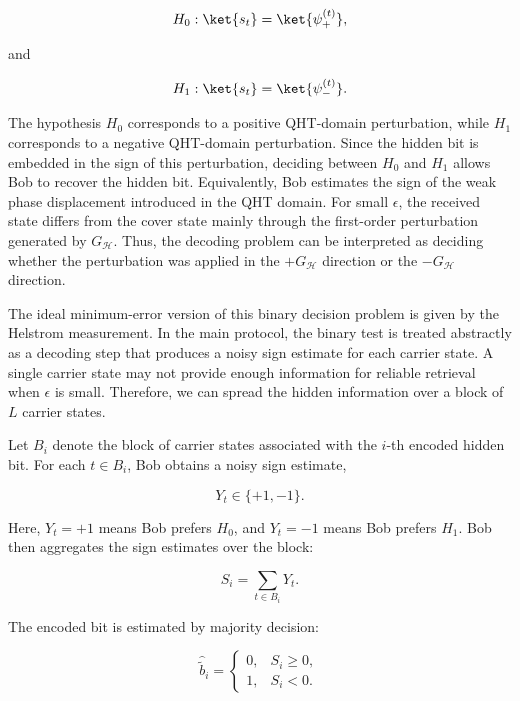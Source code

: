\documentclass[11pt]{article}
\theoremstyle{plain}
\theoremstyle{definition}
\theoremstyle{remark}
\begin{document}
\begin{equation}
H_0:
\ket{s_t}
=
\ket{\psi_{+}^{(t)}},
\end{equation}

and

\begin{equation}
H_1:
\ket{s_t}
=
\ket{\psi_{-}^{(t)}}.
\end{equation}

The hypothesis $H_0$ corresponds to a positive QHT-domain perturbation, while $H_1$ corresponds to a negative QHT-domain perturbation. Since the hidden bit is embedded in the sign of this perturbation, deciding between $H_0$ and $H_1$ allows Bob to recover the hidden bit. Equivalently, Bob estimates the sign of the weak phase displacement introduced in the QHT domain. For small $\epsilon$, the received state differs from the cover state mainly through the first-order perturbation generated by $G_{\mathcal H}$. Thus, the decoding problem can be interpreted as deciding whether the perturbation was applied in the $+G_{\mathcal H}$ direction or the $-G_{\mathcal H}$ direction.

The ideal minimum-error version of this binary decision problem is given by the Helstrom measurement. In the main protocol, the binary test is treated abstractly as a decoding step that produces a noisy sign estimate for each carrier state. A single carrier state may not provide enough information for reliable retrieval when $\epsilon$ is small. Therefore, we can spread the hidden information over a block of $L$ carrier states.

Let $B_i$ denote the block of carrier states associated with the $i$-th encoded hidden bit. For each $t\in B_i$, Bob obtains a noisy sign estimate,

\begin{equation}
Y_t\in\{+1,-1\}.
\end{equation}

Here, $Y_t=+1$ means Bob prefers $H_0$, and $Y_t=-1$ means Bob prefers $H_1$. Bob then aggregates the sign estimates over the block:

\begin{equation}
S_i
=
\sum_{t\in B_i}Y_t.
\end{equation}

The encoded bit is estimated by majority decision:

\begin{equation}
\widehat{\widetilde{b}}_i =
\begin{cases}
0, & S_i\geq0,\\
1, & S_i<0.
\end{cases}
\end{equation}
\end{document}
